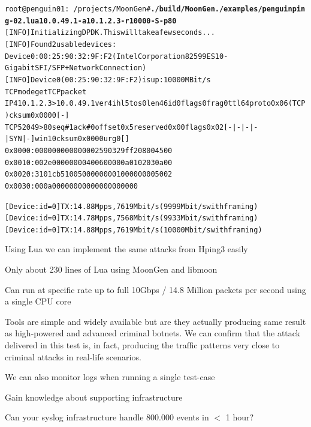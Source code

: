 \documentclass[Screen16to9,17pt]{foils}
\begin{document}

\begin{alltt}\footnotesize
root@penguin01:~/projects/MoonGen# {\bfseries ./build/MoonGen ./examples/penguinping-02.lua 10.0.49.1 -a 10.1.2.3 -r 10000 -S -p 80}
[INFO]  Initializing DPDK. This will take a few seconds...
[INFO]  Found 2 usable devices:
   Device 0: 00:25:90:32:9F:F2 (Intel Corporation 82599ES 10-Gigabit SFI/SFP+ Network Connection)
[INFO]  Device 0 (00:25:90:32:9F:F2) is up: 10000 MBit/s
TCP mode get TCP packet
IP4 10.1.2.3 > 10.0.49.1 ver 4 ihl 5 tos 0 len 46 id 0 flags 0 frag 0 ttl 64 proto 0x06 (TCP) cksum 0x0000 [-]
TCP 52049 > 80 seq# 1 ack# 0 offset 0x5 reserved 0x00 flags 0x02 [-|-|-|-|SYN|-] win 10 cksum 0x0000 urg 0 []
  0x0000:   0000 0000 0000 0025 9032 9ff2 0800 4500
  0x0010:   002e 0000 0000 4006 0000 0a01 0203 0a00
  0x0020:   3101 cb51 0050 0000 0001 0000 0000 5002
  0x0030:   000a 0000 0000 0000 0000 0000

[Device: id=0] TX: 14.88 Mpps, 7619 Mbit/s (9999 Mbit/s with framing)
[Device: id=0] TX: 14.78 Mpps, 7568 Mbit/s (9933 Mbit/s with framing)
[Device: id=0] TX: 14.88 Mpps, 7619 Mbit/s (10000 Mbit/s with framing)
\end{alltt}

\begin{list2}
\item Using Lua we can implement the same attacks from Hping3 easily
\item Only about 230 lines of Lua using MoonGen and libmoon
\item Can run at specific rate up to full 10Gbps / 14.8 Million packets per second using a single CPU core
\end{list2}



Tools are simple and widely available but are they actually producing same result
as high-powered and advanced criminal botnets. We can confirm that the attack
delivered in this test is, in fact, producing the traffic patterns very close to
criminal attacks in real-life scenarios.

\begin{list2}
\item We can also monitor logs when running a single test-case
\item Gain knowledge about supporting infrastructure
\item Can your syslog infrastructure handle 800.000 events in $<$ 1 hour?
\end{list2}
\end{document}
